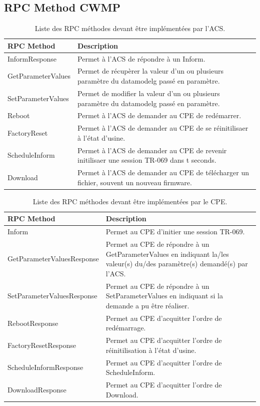 \documentclass[12pt,a4paper]{report}
\begin{document}
\newpage
\begin{appendix}
\chapter{RPC Method CWMP}
\begin{table}
	\begin{tabularx}{17cm}{|l|X|}
		\hline
		RPC Method & Description\tabularnewline
		\hline
		InformResponse & Permet à l'ACS de répondre à un Inform.\tabularnewline
		\hline
		GetParameterValues & Permet de récupèrer la valeur d'un ou plusieurs 				paramètre du {datamodelg} passé en paramètre.\tabularnewline
		\hline
		SetParameterValues & Permet de modifier la valeur d'un ou plusieurs 				paramètre du {datamodelg} passé en paramètre.\tabularnewline
		\hline
		Reboot & Permet à l'ACS de demander au CPE de redémarrer.\tabularnewline
		\hline
		FactoryReset & Permet à l'ACS de demander au CPE de se réinitilisaer à l'état d'usine.\tabularnewline
		\hline
		ScheduleInform & Permet à l'ACS de demander au CPE de revenir initilisaer une session TR-069 dans t seconds.\tabularnewline
		\hline
		Download & Permet à l'ACS de demander au CPE de télécharger un fichier, souvent un nouveau firmware.\tabularnewline
		\hline
	\end{tabularx}
	\centering
	\caption{Liste des RPC méthodes devant être implémentées par l'ACS.}
\end{table}
\begin{table}
	\begin{tabularx}{17cm}{|l|X|}
		\hline
		RPC Method & Description\tabularnewline
		\hline
		Inform & Permet au CPE d'initier une session TR-069.\tabularnewline
		\hline
		GetParameterValuesResponse & Permet au CPE de répondre à un 						GetParameterValues en indiquant la/les valeur(s) du/des paramètre(s) 				demandé(s) par l'ACS.\tabularnewline
		\hline
		SetParameterValuesResponse & Permet au CPE de répondre à un 						SetParameterValues en indiquant si la demande a pu être réaliser.\tabularnewline
		\hline
		RebootResponse & Permet au CPE d'acquitter l'ordre de redémarrage.\tabularnewline
		\hline
		FactoryResetResponse & Permet au CPE d'acquitter l'ordre de réinitilisation à l'état d'usine.\tabularnewline
		\hline
		ScheduleInformResponse & Permet au CPE d'acquitter l'ordre de ScheduleInform.\tabularnewline
		\hline
		DownloadResponse & Permet au CPE d'acquitter l'ordre de Download.\tabularnewline
		\hline
	\end{tabularx}
	\centering
	\caption{Liste des RPC méthodes devant être implémentées par le CPE.}
\end{table}


\end{appendix}
\end{document}
